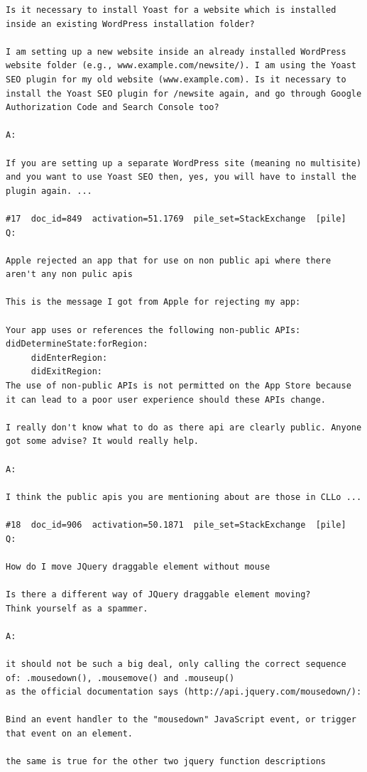 \begin{verbatim}
Is it necessary to install Yoast for a website which is installed inside an existing WordPress installation folder?

I am setting up a new website inside an already installed WordPress website folder (e.g., www.example.com/newsite/). I am using the Yoast SEO plugin for my old website (www.example.com). Is it necessary to install the Yoast SEO plugin for /newsite again, and go through Google Authorization Code and Search Console too?

A:

If you are setting up a separate WordPress site (meaning no multisite) and you want to use Yoast SEO then, yes, you will have to install the plugin again. ...

#17  doc_id=849  activation=51.1769  pile_set=StackExchange  [pile]
Q:

Apple rejected an app that for use on non public api where there aren't any non pulic apis

This is the message I got from Apple for rejecting my app:

Your app uses or references the following non-public APIs:
didDetermineState:forRegion:
     didEnterRegion:
     didExitRegion:
The use of non-public APIs is not permitted on the App Store because it can lead to a poor user experience should these APIs change.

I really don't know what to do as there api are clearly public. Anyone got some advise? It would really help.

A:

I think the public apis you are mentioning about are those in CLLo ...

#18  doc_id=906  activation=50.1871  pile_set=StackExchange  [pile]
Q:

How do I move JQuery draggable element without mouse

Is there a different way of JQuery draggable element moving?
Think yourself as a spammer.

A:

it should not be such a big deal, only calling the correct sequence of: .mousedown(), .mousemove() and .mouseup()
as the official documentation says (http://api.jquery.com/mousedown/):

Bind an event handler to the "mousedown" JavaScript event, or trigger that event on an element.

the same is true for the other two jquery function descriptions




\end{verbatim}
